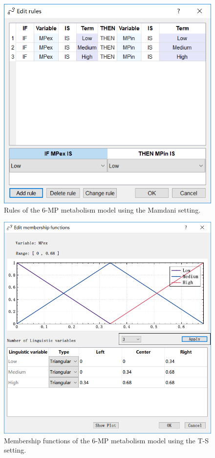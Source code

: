 \documentclass[journal,a4paper,onecolumn]{article}
\begin{document}
\begin{figure}[!hbt]
	\begin{center}
		\includegraphics[width=\columnwidth]{fig59}
		\caption{Rules of the 6-MP metabolism model using the Mamdani setting.}
		\label{fig:Rules of 6-MP metabolism using Mamdani.}
	\end{center}
\end{figure}
\begin{figure}[!hbt]
	\begin{center}
		\includegraphics[width=\columnwidth]{fig57}
		\caption{Membership functions of the 6-MP metabolism model using the T-S setting.}
		\label{fig:Membership functions of 6-MP metabolism using T-S.}
	\end{center}
\end{figure}
\end{document}
